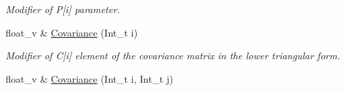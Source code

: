 \begin{DoxyCompactItemize}
\begin{DoxyCompactList}\small\item\em Modifier of P\mbox{[}i\mbox{]} parameter. \end{DoxyCompactList}\item 
float\+\_\+v \& \hyperlink{classKFParticleBaseSIMD_a4243bcff049f640d8f78da88f17e20db}{Covariance} (Int\+\_\+t i)\hypertarget{classKFParticleBaseSIMD_a4243bcff049f640d8f78da88f17e20db}{}\label{classKFParticleBaseSIMD_a4243bcff049f640d8f78da88f17e20db}

\begin{DoxyCompactList}\small\item\em Modifier of C\mbox{[}i\mbox{]} element of the covariance matrix in the lower triangular form. \end{DoxyCompactList}\item 
float\+\_\+v \& \hyperlink{classKFParticleBaseSIMD_a0c2df01356d9cbd2b7a762096c8e5a20}{Covariance} (Int\+\_\+t i, Int\+\_\+t j)\hypertarget{classKFParticleBaseSIMD_a0c2df01356d9cbd2b7a762096c8e5a20}{}\label{classKFParticleBaseSIMD_a0c2df01356d9cbd2b7a762096c8e5a20}


\end{DoxyCompactItemize}
